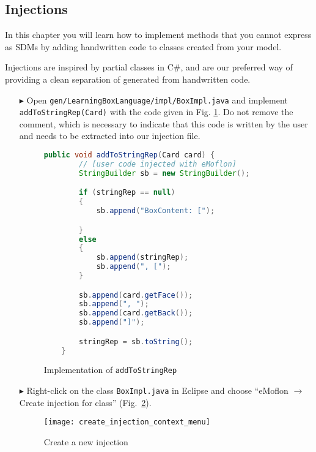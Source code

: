 \subsection{Injections}

In this chapter you will learn how to implement methods that you cannot express as SDMs by adding handwritten code to classes created from your model.

Injections are inspired by partial classes in C\#, and are our preferred way of providing a clean separation of generated from handwritten code.

\begin{enumerate}
    \item[$\blacktriangleright$] Open \texttt{gen/LearningBoxLanguage/impl/BoxImpl.java} and implement \texttt{addToStringRep(Card)} with the code given in Fig.
    \ref{fig:addToStringRep_impl}. Do not remove the comment, which is necessary to indicate that this code is written by the user and needs to be extracted
    into our injection file.

    \begin{figure}[htbp]
        \centering
        \begin{lstlisting}[language=Java, keywordstyle={\bfseries\color{purple}}, backgroundcolor=\color{white}]
    public void addToStringRep(Card card) {
        // [user code injected with eMoflon]
        StringBuilder sb = new StringBuilder();

        if (stringRep == null)
        {
            sb.append("BoxContent: [");

        }
        else
        {
            sb.append(stringRep);
            sb.append(", [");
        }

        sb.append(card.getFace());
        sb.append(", ");
        sb.append(card.getBack());
        sb.append("]");

        stringRep = sb.toString();
    }
        \end{lstlisting}
        \caption{Implementation of \texttt{addToStringRep}}
        \label{fig:addToStringRep_impl}
    \end{figure}

    \item[$\blacktriangleright$] Right-click on the class \texttt{BoxImpl.java} in Eclipse and choose ``eMoflon $\rightarrow$ Create injection for class''
    (Fig.~\ref{fig:injection_create_injection}).

    \begin{figure}[htbp]
        \centering
        \texttt{[image: create\_injection\_context\_menu]}
        \caption{Create a new injection}
        \label{fig:injection_create_injection}
    \end{figure}


\end{enumerate}
